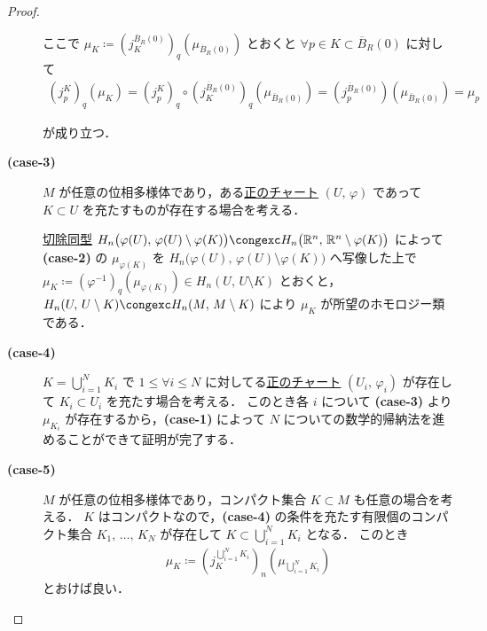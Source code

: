 \documentclass[algtopo_main]{subfiles}
\begin{document}
\begin{proof}
\begin{description}
            ここで $\mu_K \coloneqq (j_K^{\overline{B}_R(0)})_q (\mu_{\overline{B}_R(0)})$ とおくと $\forall p \in K \subset \overline{B}_R(0)$ に対して 
            \begin{align}
                (j_p^K)_q(\mu_K) = (j_p^K)_q \circ  (j_K^{\overline{B}_R(0)})_q (\mu_{\overline{B}_R(0)}) = (j_p^{\overline{B}_R(0)})(\mu_{\overline{B}_R(0)}) = \mu_p
            \end{align}
            
            が成り立つ．

            \item[\textbf{(case-3)}] $M$ が任意の位相多様体であり，ある\hyperref[def:orientable]{正のチャート} $(U,\, \varphi)$ であって $K \subset U$ を充たすものが存在する場合を考える．
            
            \hyperref[thm:exc]{切除同型} $H_n \bigl( \varphi(U),\, \varphi(U) \setminus \varphi(K) \bigr) \congexc H_n \bigl(\mathbb{R}^n,\, \mathbb{R}^n \setminus \varphi(K)\bigr)$ によって \textbf{\textsf{(case-2)}} の $\mu_{\varphi(K)}$ を $H_n \bigl( \varphi(U),\, \varphi(U) \setminus \varphi(K) \bigr)$ へ写像した上で
            $\mu_K \coloneqq (\varphi^{-1})_q (\mu_{\varphi(K)}) \in H_n(U,\, U \setminus K)$ とおくと，$H_n(U,\, U \setminus K) \congexc H_n (M,\, M \setminus K)$ により $\mu_K$ が所望のホモロジー類である．

            \item[\textbf{(case-4)}] $K = \bigcup_{i=1}^N K_i$ で $1 \le \forall i \le N$ に対してる\hyperref[def:orientable]{正のチャート} $(U_i,\, \varphi_i)$ が存在して $K_i \subset U_i$ を充たす場合を考える．
            このとき各 $i$ について \textbf{\textsf{(case-3)}} より $\mu_{K_i}$ が存在するから，\textbf{\textsf{(case-1)}} によって $N$ についての数学的帰納法を進めることができて証明が完了する．

            \item[\textbf{(case-5)}] $M$ が任意の位相多様体であり，コンパクト集合 $K \subset M$ も任意の場合を考える．
            $K$ はコンパクトなので，\textbf{\textsf{(case-4)}} の条件を充たす有限個のコンパクト集合 $K_1,\, \dots ,\, K_N$ が存在して $K \subset \bigcup_{i=1}^N K_i$ となる．
            このとき
            \begin{align}
                \mu_K \coloneqq (j_K^{\bigcup_{i=1}^N K_i})_n (\mu_{\bigcup_{i=1}^N K_i})
            \end{align}
            とおけば良い．
    \end{description}
\end{proof}
\end{document}
